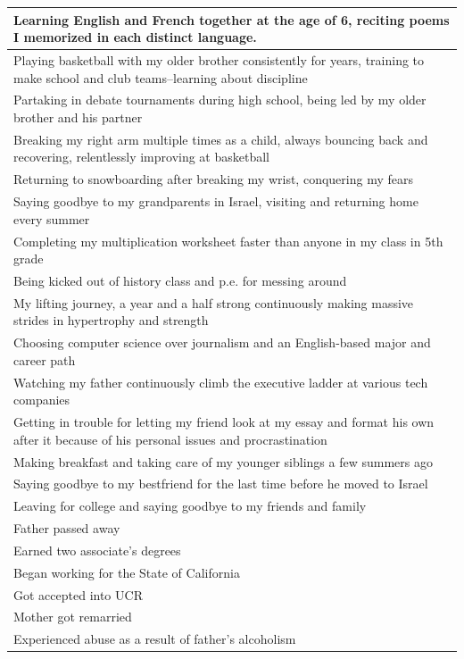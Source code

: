 \documentclass[
  .7em,
  letterpaper,
  DIV=11,
  numbers=noendperiod]{scrartcl}
\begin{document}
\begin{table}
\begin{tabular}{l}
\hline
Learning English and French together at the age of 6, reciting poems I memorized in each distinct language.\\
\hline
Playing basketball with my older brother consistently for years, training to make school and club teams--learning about discipline\\
\hline
Partaking in debate tournaments during high school, being led by my older brother and his partner\\
\hline
Breaking my right arm multiple times as a child, always bouncing back and recovering, relentlessly improving at basketball\\
\hline
Returning to snowboarding after breaking my wrist, conquering my fears\\
\hline
Saying goodbye to my grandparents in Israel, visiting and returning home every summer\\
\hline
Completing my multiplication worksheet faster than anyone in my class in 5th grade\\
\hline
Being kicked out of history class and p.e. for messing around\\
\hline
My lifting journey, a year and a half strong continuously making massive strides in hypertrophy and strength\\
\hline
Choosing computer science over journalism and an English-based major and career path\\
\hline
Watching my father continuously climb the executive ladder at various tech companies\\
\hline
Getting in trouble for letting my friend look at my essay and format his own after it because of his personal issues and procrastination\\
\hline
Making breakfast and taking care of my younger siblings a few summers ago\\
\hline
Saying goodbye to my bestfriend for the last time before he moved to Israel\\
\hline
Leaving for college and saying goodbye to my friends and family\\
\hline
Father passed away\\
\hline
Earned two associate's degrees\\
\hline
Began working for the State of California\\
\hline
Got accepted into UCR\\
\hline
Mother got remarried\\
\hline
Experienced abuse as a result of father's alcoholism\\

\end{tabular}
\end{table}
\end{document}
